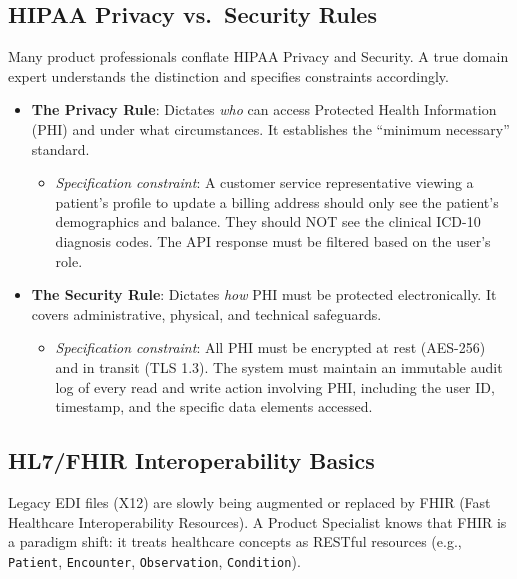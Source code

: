 \documentclass[
  11pt,
  openany,
  oneside]{book}
\providecommand{\tightlist}{%
  \setlength{\itemsep}{0pt}\setlength{\parskip}{0pt}}
\begin{document}
\subsection{HIPAA Privacy vs.~Security
Rules}\label{hipaa-privacy-vs.-security-rules}

Many product professionals conflate HIPAA Privacy and Security. A true
domain expert understands the distinction and specifies constraints
accordingly.

\begin{itemize}
\tightlist
\item
  \textbf{The Privacy Rule}: Dictates \emph{who} can access Protected
  Health Information (PHI) and under what circumstances. It establishes
  the ``minimum necessary'' standard.

  \begin{itemize}
  \tightlist
  \item
    \emph{Specification constraint}: A customer service representative
    viewing a patient's profile to update a billing address should only
    see the patient's demographics and balance. They should NOT see the
    clinical ICD-10 diagnosis codes. The API response must be filtered
    based on the user's role.
  \end{itemize}
\item
  \textbf{The Security Rule}: Dictates \emph{how} PHI must be protected
  electronically. It covers administrative, physical, and technical
  safeguards.

  \begin{itemize}
  \tightlist
  \item
    \emph{Specification constraint}: All PHI must be encrypted at rest
    (AES-256) and in transit (TLS 1.3). The system must maintain an
    immutable audit log of every read and write action involving PHI,
    including the user ID, timestamp, and the specific data elements
    accessed.
  \end{itemize}
\end{itemize}

\subsection{HL7/FHIR Interoperability
Basics}\label{hl7fhir-interoperability-basics}

Legacy EDI files (X12) are slowly being augmented or replaced by FHIR
(Fast Healthcare Interoperability Resources). A Product Specialist knows
that FHIR is a paradigm shift: it treats healthcare concepts as RESTful
resources (e.g., \texttt{Patient}, \texttt{Encounter},
\texttt{Observation}, \texttt{Condition}).
\end{document}
